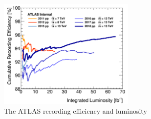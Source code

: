 \begin{figure}[!h]                
	\includegraphics[width=0.6\textwidth]{Chapter2/recefficiency.png}
	\centering
	\begin{center}
		\caption{The ATLAS recording efficiency and luminosity}
		\label{Fig:recefficiency}            
	\end{center}
\end{figure}
